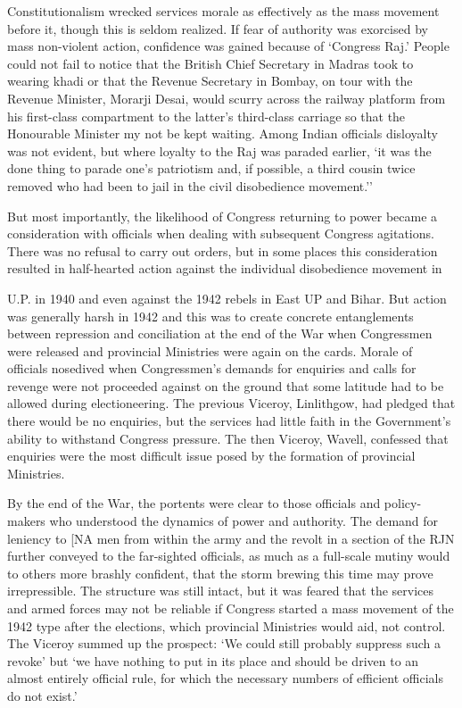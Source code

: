 \begin{multicols}{2}
Constitutionalism wrecked services morale as effectively as the mass movement before it, though this is seldom realized. If fear of authority was exorcised by mass non-violent action, confidence was gained because of `Congress Raj.' People could not fail to notice that the British Chief Secretary in Madras took to wearing khadi or that the Revenue Secretary in Bombay, on tour with the Revenue Minister, Morarji Desai, would scurry across the railway platform from his first-class compartment to the latter's third-class carriage so that the Honourable Minister my not be kept waiting. Among Indian officials disloyalty was not evident, but where loyalty to the Raj was paraded earlier, `it was the done thing to parade one's patriotism and, if possible, a third cousin twice removed who had been to jail in the civil disobedience movement.'' 

But most importantly, the likelihood of Congress returning to power became a consideration with officials when dealing with subsequent Congress agitations. There was no refusal to carry out orders, but in some places this consideration resulted in half-hearted action against the individual disobedience movement in 

U.P. in 1940 and even against the 1942 rebels in East UP and Bihar. But action was generally harsh in 1942 and this was to create concrete entanglements between repression and conciliation at the end of the War when Congressmen were released and provincial Ministries were again on the cards. Morale of officials nosedived when Congressmen's demands for enquiries and calls for revenge were not proceeded against on the ground that some latitude had to be allowed during electioneering. The previous Viceroy, Linlithgow, had pledged that there would be no enquiries, but the services had little faith in the Government's ability to withstand Congress pressure. The then Viceroy, Wavell, confessed that enquiries were the most difficult issue posed by the formation of provincial Ministries. 

By the end of the War, the portents were clear to those officials and policy-makers who understood the dynamics of power and authority. The demand for leniency to [NA men from within the army and the revolt in a section of the RJN further conveyed to the far-sighted officials, as much as a full-scale mutiny would to others more brashly confident, that the storm brewing this time may prove irrepressible. The structure was still intact, but it was feared that the services and armed forces may not be reliable if Congress started a mass movement of the 1942 type after the elections, which provincial Ministries would aid, not control. The Viceroy summed up the prospect: `We could still probably suppress such a revoke' but `we have nothing to put in its place and should be driven to an almost entirely official rule, for which the necessary numbers of efficient officials do not exist.' 


\end{multicols}

